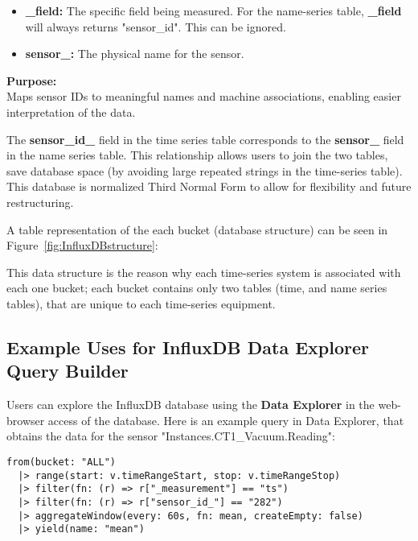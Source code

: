\documentclass{article}
\begin{document}
\begin{enumerate}
\begin{itemize}
        \item \textbf{\_field:} The specific field being measured. For the name-series table, \textbf{\_field} will always returns "sensor\_id". This can be ignored.

        \item \textbf{sensor\_:} The physical name for the sensor.
    \end{itemize}
    \textbf{Purpose:}
    \\
    \noindent
    Maps sensor IDs to meaningful names and machine associations, enabling easier interpretation of the data.
\end{enumerate}

\noindent
The \textbf{sensor\_id\_} field in the time series table corresponds to the \textbf{sensor\_} field in the name series table. This relationship allows users to join the two tables, save database space (by avoiding large repeated strings in the time-series table). This database is normalized Third Normal Form to allow for flexibility and future restructuring.

\vspace{5pt}
\noindent
A table representation of the each bucket (database structure) can be seen in Figure~\ref{fig:InfluxDBstructure}:

\vspace{5pt}
\noindent
This data structure is the reason why each time-series system is associated with each one bucket; each bucket contains only two tables (time, and name series tables), that are unique to each time-series equipment.

\subsection{Example Uses for InfluxDB Data Explorer Query Builder}

Users can explore the InfluxDB database using the \textbf{Data Explorer} in the web-browser access of the database. Here is an example query in Data Explorer, that obtains the data for the sensor "Instances.CT1\_Vacuum.Reading":

\begin{verbatim}
from(bucket: "ALL")
  |> range(start: v.timeRangeStart, stop: v.timeRangeStop)
  |> filter(fn: (r) => r["_measurement"] == "ts")
  |> filter(fn: (r) => r["sensor_id_"] == "282")
  |> aggregateWindow(every: 60s, fn: mean, createEmpty: false)
  |> yield(name: "mean")
\end{verbatim}
\end{document}
